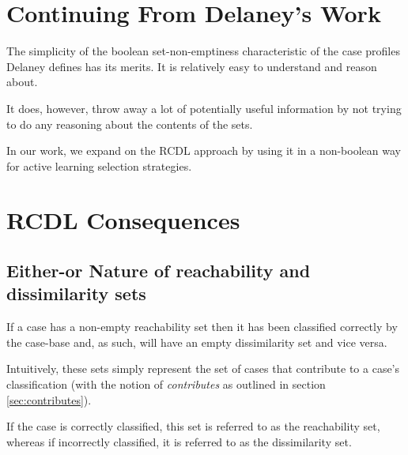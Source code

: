 \documentclass[a4paper,11pt]{report}
\begin{document}
\section{Continuing From Delaney's Work}
The simplicity of the boolean set-non-emptiness characteristic of the case profiles Delaney defines has its merits. It is relatively easy to understand and reason about. 

It does, however, throw away a lot of potentially useful information by not trying to do any reasoning about the contents of the sets.

In our work, we expand on the RCDL approach by using it in a non-boolean way for active learning selection strategies.

\section{RCDL Consequences}

\subsection{Either-or Nature of reachability and dissimilarity sets}
If a case has a non-empty reachability set then it has been classified correctly by the case-base and, as such, will have an empty dissimilarity set and vice versa.

Intuitively, these sets simply represent the set of cases that contribute to a case's classification (with the notion of \emph{contributes} as outlined in section \ref{sec:contributes}). 

If the case is correctly classified, this set is referred to as the reachability set, whereas if incorrectly classified, it is referred to as the dissimilarity set.
\end{document}
